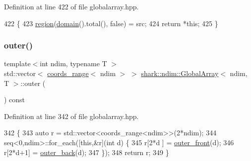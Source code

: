 Definition at line 422 of file globalarray.\+hpp.


\begin{DoxyCode}
422                                                                         \{
423             \hyperlink{classshark_1_1ndim_1_1_global_array_a40939e7384b55a49b59c63dc717224d2}{region}(\hyperlink{classshark_1_1ndim_1_1_global_array_a435ee8ff23c3feadf2ef2be64d4f375c}{domain}().total(), \textcolor{keyword}{false}) = src;
424             \textcolor{keywordflow}{return} *\textcolor{keyword}{this};
425         \}
\end{DoxyCode}
\hypertarget{classshark_1_1ndim_1_1_global_array_a93f43e778ca040cb2ca8ad05dcb02ab0}{}\label{classshark_1_1ndim_1_1_global_array_a93f43e778ca040cb2ca8ad05dcb02ab0} 
\subsubsection{\texorpdfstring{outer()}{outer()}}
{\footnotesize\ttfamily template$<$int ndim, typename T $>$ \\
std\+::vector$<$ \hyperlink{structshark_1_1ndim_1_1coords__range}{coords\+\_\+range}$<$ ndim $>$ $>$ \hyperlink{classshark_1_1ndim_1_1_global_array}{shark\+::ndim\+::\+Global\+Array}$<$ ndim, T $>$\+::outer (\begin{DoxyParamCaption}{ }\end{DoxyParamCaption}) const\hspace{0.3cm}{\ttfamily [inline]}}



Definition at line 342 of file globalarray.\+hpp.


\begin{DoxyCode}
342                                                                               \{
343                         \textcolor{keyword}{auto} r = std::vector<coords\_range<ndim>>(2*ndim);
344                         seq<0,ndim>::for\_each([\textcolor{keyword}{this},&r](\textcolor{keywordtype}{int} d) \{ 
345                                 r[2*d  ] = \hyperlink{classshark_1_1ndim_1_1_global_array_a991cfff5cda18b938bc52cfc1c383680}{outer\_front}(d);
346                                 r[2*d+1] = \hyperlink{classshark_1_1ndim_1_1_global_array_a6f07daf32776f286cffa8620a456a3cd}{outer\_back}(d);
347                         \});
348                         \textcolor{keywordflow}{return} r;
349         \}
\end{DoxyCode}
\hypertarget{classshark_1_1ndim_1_1_global_array_a6f07daf32776f286cffa8620a456a3cd}{}\label{classshark_1_1ndim_1_1_global_array_a6f07daf32776f286cffa8620a456a3cd} 
